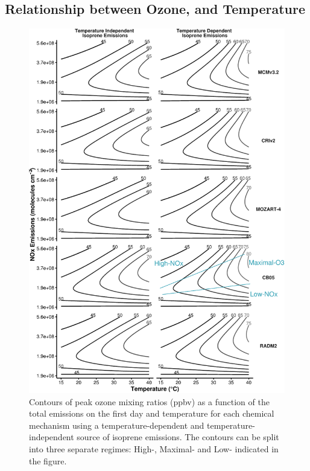 \subsection[Relationship between ozone, NOx and Temperature]{Relationship between Ozone,  and Temperature} \label{ss:r_contours} 
\begin{figure}%
    \centering%
    \caption{Contours of peak ozone mixing ratios (ppbv) as a function of the total  emissions on the first day and temperature for each chemical mechanism using a temperature-dependent and temperature-independent source of isoprene emissions. The contours can be split into three separate regimes: High-, Maximal- and Low- indicated in the figure.}
    \label{f:ozone_contours}%
    \includegraphics[width=\textwidth]{img/O3_comparison}%
\end{figure}

